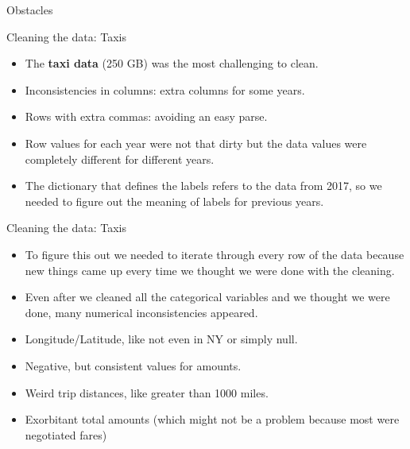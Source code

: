 \documentclass[10pt,ignorenonframetext,]{beamer}
\providecommand{\tightlist}{%
  \setlength{\itemsep}{0pt}\setlength{\parskip}{0pt}}
\begin{document}
\begin{frame}{%
\protect\hypertarget{obstacles}{%
Obstacles}}

\begin{block}{Cleaning the data: Taxis}

\begin{itemize}[<+->]
\tightlist
\item
  The \textbf{taxi data} (250 GB) was the most challenging to clean.
\end{itemize}

\begin{itemize}[<+->]
\tightlist
\item
  Inconsistencies in columns: extra columns for some years.
\end{itemize}

\begin{itemize}[<+->]
\tightlist
\item
  Rows with extra commas: avoiding an easy parse.
\end{itemize}

\begin{itemize}[<+->]
\tightlist
\item
  Row values for each year were not that dirty but the data values were
  completely different for different years.
\end{itemize}

\begin{itemize}[<+->]
\tightlist
\item
  The dictionary that defines the labels refers to the data from 2017,
  so we needed to figure out the meaning of labels for previous years.
\end{itemize}

\end{block}

\end{frame}

\begin{frame}

\begin{block}{Cleaning the data: Taxis}

\begin{itemize}[<+->]
\tightlist
\item
  To figure this out we needed to iterate through every row of the data
  because new things came up every time we thought we were done with the
  cleaning.
\item
  Even after we cleaned all the categorical variables and we thought we
  were done, many numerical inconsistencies appeared.
\item
  Longitude/Latitude, like not even in NY or simply null.
\item
  Negative, but consistent values for amounts.
\item
  Weird trip distances, like greater than 1000 miles.
\item
  Exorbitant total amounts (which might not be a problem because most
  were negotiated fares)
\end{itemize}

\end{block}

\end{frame}
\end{document}
